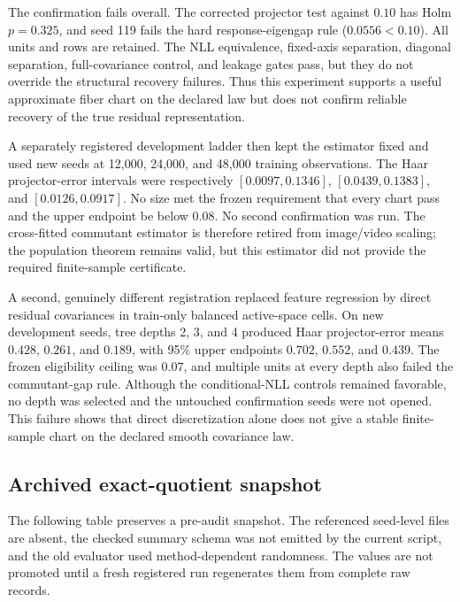 The confirmation fails overall.  The corrected projector test against $0.10$ has Holm $p=0.325$, and seed 119 fails the hard response-eigengap rule ($0.0556<0.10$).  All units and rows are retained.  The NLL equivalence, fixed-axis separation, diagonal separation, full-covariance control, and leakage gates pass, but they do not override the structural recovery failures.  Thus this experiment supports a useful approximate fiber chart on the declared law but does not confirm reliable recovery of the true residual representation.

A separately registered development ladder then kept the estimator fixed and used new seeds at 12,000, 24,000, and 48,000 training observations.  The Haar projector-error intervals were respectively $[0.0097,0.1346]$, $[0.0439,0.1383]$, and $[0.0126,0.0917]$.  No size met the frozen requirement that every chart pass and the upper endpoint be below $0.08$.  No second confirmation was run.  The cross-fitted commutant estimator is therefore retired from image/video scaling; the population theorem remains valid, but this estimator did not provide the required finite-sample certificate.

A second, genuinely different registration replaced feature regression by direct residual covariances in train-only balanced active-space cells.  On new development seeds, tree depths 2, 3, and 4 produced Haar projector-error means $0.428$, $0.261$, and $0.189$, with 95\% upper endpoints $0.702$, $0.552$, and $0.439$.  The frozen eligibility ceiling was $0.07$, and multiple units at every depth also failed the commutant-gap rule.  Although the conditional-NLL controls remained favorable, no depth was selected and the untouched confirmation seeds were not opened.  This failure shows that direct discretization alone does not give a stable finite-sample chart on the declared smooth covariance law.
\clearpage

\subsection{Archived exact-quotient snapshot}

The following table preserves a pre-audit snapshot.  The referenced seed-level files are absent, the checked summary schema was not emitted by the current script, and the old evaluator used method-dependent randomness.  The values are not promoted until a fresh registered run regenerates them from complete raw records.


